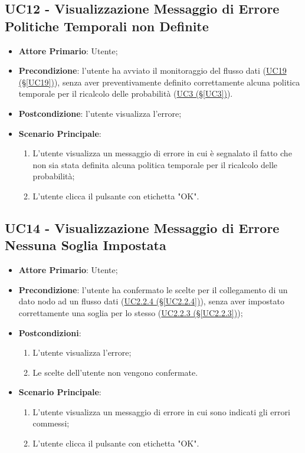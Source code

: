 \pagebreak

\subsection{UC12 - Visualizzazione Messaggio di Errore Politiche Temporali non Definite}\label{UC12}
\begin{itemize}
\item \textbf{Attore Primario}: Utente;
\item \textbf{Precondizione}: l'utente ha avviato il monitoraggio del flusso dati (\hyperref[UC19]{UC19 							(§\ref*{UC19})}), senza aver preventivamente definito correttamente alcuna politica temporale per il ricalcolo delle probabilità (\hyperref[UC3]{UC3 (§\ref*{UC3})}).
\item \textbf{Postcondizione}: l'utente visualizza l'errore;
\item \textbf{Scenario Principale}: 
	\begin{enumerate}
	\item L'utente visualizza un messaggio di errore in cui è segnalato il fatto che non sia stata definita alcuna 				politica temporale per il ricalcolo delle probabilità;
	\item L'utente clicca il pulsante con etichetta "OK".
	\end{enumerate}
\end{itemize}

\newpage

\subsection{UC14 - Visualizzazione Messaggio di Errore Nessuna Soglia Impostata}\label{UC14}
\begin{itemize}
\item \textbf{Attore Primario}: Utente;
\item \textbf{Precondizione}: l'utente ha confermato le scelte per il collegamento di un dato nodo ad un flusso 				dati (\hyperref[UC2.2.4]{UC2.2.4 (§\ref*{UC2.2.4})}), senza aver impostato correttamente una soglia per lo stesso 	(\hyperref[UC2.2.3]{UC2.2.3 (§\ref*{UC2.2.3})});
\item \textbf{Postcondizioni}: 
	\begin{enumerate}
	\item L'utente visualizza l'errore;
	\item Le scelte dell'utente non vengono confermate.
	\end{enumerate}
\item \textbf{Scenario Principale}: 
	\begin{enumerate}
	\item L'utente visualizza un messaggio di errore in cui sono indicati gli errori commessi;
	\item L'utente clicca il pulsante con etichetta "OK".
	\end{enumerate}
\end{itemize}

